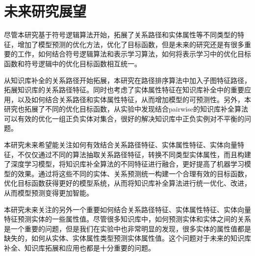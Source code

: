 \section{未来研究展望}
尽管本研究基于符号逻辑算法开始，拓展了关系路径和实体属性等不同类型的特征，增加了模型预测的优化方法，优化了目标函数，但是未来的研究还是有很多重要的工作，如何结合符号逻辑算法和表示学习算法，如何将表示学习中的优化目标函数和符号逻辑中的优化目标函数相互统一。

从知识库补全的关系路径开始拓展，本研究在路径排序算法中加入子图特征路径，拓展知识库的关系路径特征。同时也考虑了实体属性特征在知识库补全中的重要应用，以及如何结合关系路径和实体属性特征，从而增加模型的可预测性。另外，本研究也拓展了不同的优化目标函数，从实验中发现结合pairwise的知识库补全算法可以有效的优化一组正负实体对集合，很好的解决知识库中正负实例对不平衡的问题。

本研究未来希望能关注如何有效结合关系路径特征、实体属性特征、实体向量特征，不仅仅通过不同的算法抽取关系路径特征，转换不同类型实体属性，而且构建了深度学习模型，将知识库补全算法的不同特征进行融合，更好提高了机器学习模型的效果。通过将这些不同的实体、关系预测统一构建一个合理有效的目标函数，优化目标函数获得更好的模型系统，从而将知识库补全算法进行统一优化、改进，从而模型预测变得更加智能。

本研究未来关注的另外一个重要如何结合关系路径特征、实体属性特征、实体向量特征预测实体的一些属性值。尽管很多知识库中，如何预测实体和实体之间的关系是一个重要的问题，但是我们在实验中也非常明显的发现，很多实体的属性值都是缺失的，如何从实体、实体属性类型预测实体属性值。这个问题对于未来的知识库补全、知识库拓展和应用也都是十分重要的问题。
